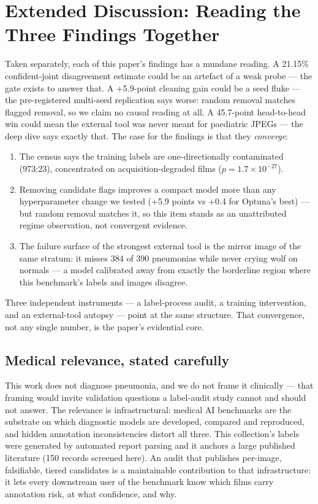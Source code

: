 \section{Extended Discussion: Reading the Three Findings Together}
\label{sec:discext}
Taken separately, each of this paper's findings has a mundane reading.
A 21.15\% confident-joint disagreement estimate could be an artefact of a weak
probe --- the gate exists to answer that. A +5.9-point cleaning gain could be a seed fluke --- the pre-registered multi-seed replication says worse: random removal matches flagged removal, so we claim no causal reading at all. A 45.7-point head-to-head win could mean the external tool
was never meant for paediatric JPEGs --- the deep dive says exactly
that. The case for the findings is that they \emph{converge}:
\begin{enumerate}
\item The census says the training labels are one-directionally
contaminated (973:23), concentrated on acquisition-degraded films
($p=1.7\times10^{-27}$).
\item Removing candidate flags improves a compact model more than any hyperparameter change we tested (+5.9 points vs +0.4 for Optuna's best) --- but random removal matches it, so this item stands as an unattributed regime observation, not convergent evidence.
\item The failure surface of the strongest external tool is the mirror
image of the same stratum: it misses 384 of 390 pneumonias while never
crying wolf on normals --- a model calibrated away from exactly the
borderline region where this benchmark's labels and images disagree.
\end{enumerate}
Three independent instruments --- a label-process audit, a training
intervention, and an external-tool autopsy --- point at the same
structure. That convergence, not any single number, is the paper's
evidential core.
\subsection{Medical relevance, stated carefully}
This work does not diagnose pneumonia, and we do not frame it clinically
--- that framing would invite validation questions a label-audit study
cannot and should not answer. The relevance is infrastructural: medical
AI benchmarks are the substrate on which diagnostic models are developed,
compared and reproduced, and hidden annotation inconsistencies distort
all three. This collection's labels were generated by automated report
parsing and it anchors a large published literature (150 records
screened here). An audit that publishes per-image, falsifiable,
tiered candidates is a maintainable contribution to that infrastructure:
it lets every downstream user of the benchmark know which films carry
annotation risk, at what confidence, and why.
